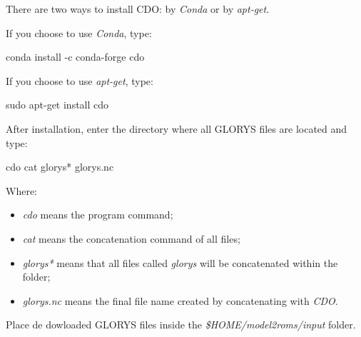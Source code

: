 \noindent There are two ways to install CDO: by \textit{Conda} or by \textit{apt-get}.
\bigskip

\noindent If you choose to use \textit{Conda}, type:
\bigskip

\begin{bashcode}
conda install -c conda-forge cdo
\end{bashcode}
\bigskip

\noindent If you choose to use \textit{apt-get}, type:
\bigskip

\begin{bashcode}
sudo apt-get install cdo
\end{bashcode}
\bigskip

\noindent After installation, enter the directory where all GLORYS files are located and type:
\bigskip

\begin{bashcode}
cdo cat glorys* glorys.nc
\end{bashcode}
\bigskip

\noindent Where: 
\bigskip

\begin{itemize}
    \item  \textit{cdo} means the program command;
    \item \textit{cat} means the concatenation command of all files;
    \item \textit{glorys*} means that all files called \textit{glorys} will be concatenated within the folder;
    \item \textit{glorys.nc} means the final file name created by concatenating with \textit{CDO}.
\end{itemize}
\bigskip

\begin{tcolorbox}[enhanced,
    grow to left by   = 0cm,
    grow to right by  = 0cm,
    enlarge top by    = 0cm,
    enlarge bottom by = 0cm,
    tcbox raise base,
    boxrule           = 1.0pt,
    left              = 18mm,
    colframe          = red!50!black,coltext=red!25!black,colback=red!10!white,
    overlay           = {\begin{tcbclipinterior}\fill[red!75!blue!50!white] (frame.south west)
      rectangle node[text=white,font=\sffamily\bfseries\footnotesize,rotate=0] {WARNING} ([xshift=18mm]frame.north west);\end{tcbclipinterior}}]
Place de dowloaded GLORYS files inside the \textit{\$HOME/model2roms/input} folder.
\end{tcolorbox}

